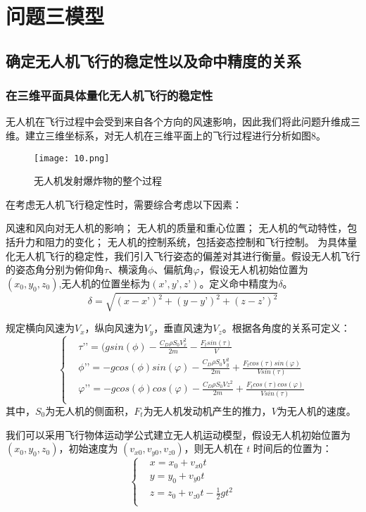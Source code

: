\documentclass[normalsize]{ctexart}
\begin{document}
		\section{问题三模型}
		\subsection{确定无人机飞行的稳定性以及命中精度的关系}
		\subsubsection{在三维平面具体量化无人机飞行的稳定性}
		无人机在飞行过程中会受到来自各个方向的风速影响，因此我们将此问题升维成三维。建立三维坐标系，对无人机在三维平面上的飞行过程进行分析如图8。
		\begin{figure}[h]
			
			\centering
			\texttt{[image: 10.png]}
			\caption{无人机发射爆炸物的整个过程}
			
		\end{figure}
	在考虑无人机飞行稳定性时，需要综合考虑以下因素：
	
	风速和风向对无人机的影响；
	无人机的质量和重心位置；
	无人机的气动特性，包括升力和阻力的变化；
	无人机的控制系统，包括姿态控制和飞行控制。
	为具体量化无人机飞行的稳定性，我们引入飞行姿态的偏差对其进行衡量。假设无人机飞行的姿态角分别为俯仰角$\tau$、横滚角$\phi$、偏航角$\varphi$，假设无人机初始位置为$(x_0,y_0,z_0)$,无人机的位置坐标为$(x’,y’,z’)$。定义命中精度为$\delta$。
	\begin{equation}
		\delta=\sqrt{(x-x’)^2 + (y-y’)^2 + (z-z’)^2}
	\end{equation}
\par 规定横向风速为$V_x$，纵向风速为$V_y$，垂直风速为$V_z$。根据各角度的关系可定义：
\begin{equation}
	\begin{cases}
		&\tau’’ =(gsin(\phi) - \frac{C_DρS_0V_x^2}{2m} - \frac{F_tsin(\tau)}{V}\\
		
		&\phi’’ = -gcos(\phi)sin(\varphi) - \frac{C_DρS_0V_y^2}{2m} + \frac{F_tcos(\tau)sin(\varphi)}{Vsin(\tau)}\\
		
		&\varphi’’ =-gcos(\phi)cos(\varphi) - \frac{C_DρS_0Vz^2}{2m} + \frac{F_tcos(\tau)cos(\varphi)}{Vsin(\tau)}\\
		
	\end{cases}
\end{equation}
其中，$S_0$为无人机的侧面积，$F_t$为无人机发动机产生的推力，$V$为无人机的速度。
	\par 我们可以采用飞行物体运动学公式建立无人机运动模型，假设无人机初始位置为 $(x_0, y_0, z_0)$，初始速度为 $(v_{x0}, v_{y0}, v_{z0})$，则无人机在 $t$ 时间后的位置为：
	\begin{equation}
	  \begin{cases}
	  	&x=x_0+v_{x0}t\\
	  	&y=y_0+v_{y0}t\\
	  	&z=z_0+v_{z0}t-\frac{1}{2}gt^2\\
  		  \end{cases}
	\end{equation}
	
\end{document}
